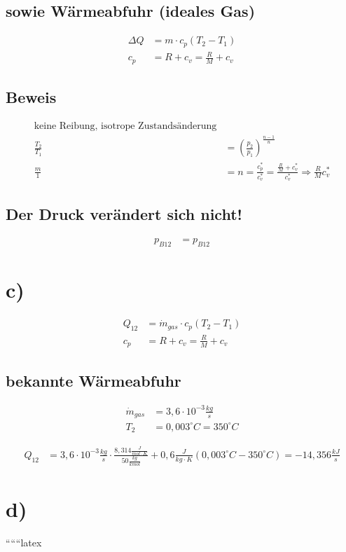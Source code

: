 \subsection*{sowie Wärmeabfuhr (ideales Gas)}
\begin{align*}
    \Delta Q &= m \cdot c_p \left( T_2 - T_1 \right) \\
    c_p &= R + c_v = \frac{R}{M} + c_v
\end{align*}

\subsection*{Beweis}
\begin{align*}
    \text{keine Reibung, isotrope Zustandsänderung} \\
    \frac{T_2}{T_1} &= \left( \frac{p_2}{p_1} \right)^{\frac{n-1}{n}} \\
    \frac{m}{1} &= n = \frac{c_p^*}{c_v^*} = \frac{\frac{R}{M} + c_v^*}{c_v^*} \Rightarrow \frac{R}{M}c_v^*
\end{align*}

\subsection*{Der Druck verändert sich nicht!}
\begin{align*}
    p_{B12} &= p_{B12}
\end{align*}

\section*{c)}
\begin{align*}
    Q_{12} &= \dot{m}_{gas} \cdot c_p \left( T_2 - T_1 \right) \\
    c_p &= R + c_v = \frac{R}{M} + c_v
\end{align*}

\subsection*{bekannte Wärmeabfuhr}
\begin{align*}
    \dot{m}_{gas} &= 3,6 \cdot 10^{-3} \frac{kg}{s} \\
    T_2 &= 0,003^\circ C = 350^\circ C
\end{align*}

\begin{align*}
    Q_{12} &= 3,6 \cdot 10^{-3} \frac{kg}{s} \cdot \frac{8,314 \frac{J}{mol \cdot K}}{50 \frac{kg}{kmol}} + 0,6 \frac{J}{kg \cdot K} \left( 0,003^\circ C - 350^\circ C \right) = -14,356 \frac{kJ}{s}
\end{align*}

\section*{d)}
``````latex


